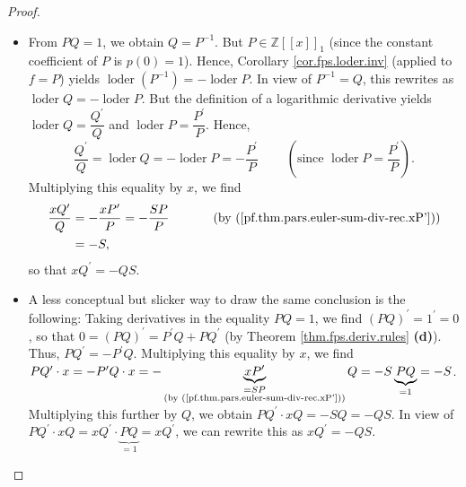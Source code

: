 \begin{proof}
\begin{itemize}
\item From $PQ=1$, we obtain $Q=P^{-1}$. But $P\in\mathbb{Z}\left[  \left[
x\right]  \right]  _{1}$ (since the constant coefficient of $P$ is $p\left(
0\right)  =1$). Hence, Corollary \ref{cor.fps.loder.inv} (applied to $f=P$)
yields $\operatorname*{loder}\left(  P^{-1}\right)  =-\operatorname*{loder}P$.
In view of $P^{-1}=Q$, this rewrites as $\operatorname*{loder}%
Q=-\operatorname*{loder}P$. But the definition of a logarithmic derivative
yields $\operatorname*{loder}Q=\dfrac{Q^{\prime}}{Q}$ and
$\operatorname*{loder}P=\dfrac{P^{\prime}}{P}$. Hence,
\[
\dfrac{Q^{\prime}}{Q}=\operatorname*{loder}Q=-\operatorname*{loder}%
P=-\dfrac{P^{\prime}}{P}\ \ \ \ \ \ \ \ \ \ \left(  \text{since }%
\operatorname*{loder}P=\dfrac{P^{\prime}}{P}\right)  .
\]
Multiplying this equality by $x$, we find%
\begin{align*}
\dfrac{xQ^{\prime}}{Q}  &  =-\dfrac{xP^{\prime}}{P}=-\dfrac{SP}{P}%
\ \ \ \ \ \ \ \ \ \ \left(  \text{by (\ref{pf.thm.pars.euler-sum-div-rec.xP'}%
)}\right) \\
&  =-S,
\end{align*}
so that $xQ^{\prime}=-QS$.

\item A less conceptual but slicker way to draw the same conclusion is the
following: Taking derivatives in the equality $PQ=1$, we find $\left(
PQ\right)  ^{\prime}=1^{\prime}=0$, so that $0=\left(  PQ\right)  ^{\prime
}=P^{\prime}Q+PQ^{\prime}$ (by Theorem \ref{thm.fps.deriv.rules}
\textbf{(d)}). Thus, $PQ^{\prime}=-P^{\prime}Q$. Multiplying this equality by
$x$, we find $PQ^{\prime}\cdot x=-P^{\prime}Q\cdot x=-\underbrace{xP^{\prime}%
}_{\substack{=SP\\\text{(by (\ref{pf.thm.pars.euler-sum-div-rec.xP'}))}%
}}Q=-S\underbrace{PQ}_{=1}=-S$. Multiplying this further by $Q$, we obtain
$PQ^{\prime}\cdot xQ=-SQ=-QS$. In view of $PQ^{\prime}\cdot xQ=xQ^{\prime
}\cdot\underbrace{PQ}_{=1}=xQ^{\prime}$, we can rewrite this as $xQ^{\prime
}=-QS$.
\end{itemize}


\end{proof}
